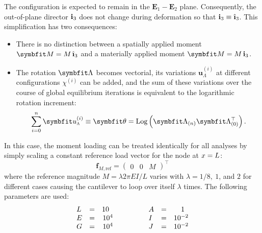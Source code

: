 %
%
The configuration is expected
to remain in the \(\mathbf{E}_1 - \mathbf{E}_2\) plane.
Consequently, the out-of-plane director
\(\mathbf{i}_3\) does not change during deformation so that \(\FrameBasis_3 \equiv \frameBasis_3\).
This simplification has two consequences:
\begin{itemize}
  \item There is no distinction between a spatially applied moment \(\bm{M} = M \, \frameBasis_3\)
    and a materially applied moment \(\bm{M} = M \, \FrameBasis_3\).
  \item The rotation \(\FrameRotation\) becomes
    vectorial, its variations \(\bm{u}_{\scriptscriptstyle{\Lambda}}^{(i)}\) at different configurations \(\chi^{(i)}\) can be added, and the sum of these variations over the course of global equilibrium iterations is equivalent
    to the logarithmic rotation increment:
    \[
      \sum_{i=0}^n \bm{u}_{\scriptscriptstyle{\Lambda}}^{(i)} \equiv \bm{\theta} 
     = \operatorname{Log} \left(\FrameRotation_{(n)}\FrameRotation_{(0)}^{\top}\right).
    \]
\end{itemize}
%
In this case, the moment loading can be treated identically for all analyses by simply scaling a constant reference load vector for the node at \(x=L\):
%
\begin{equation}
  \mathbf{f}_{M,\text{ref}} = \begin{pmatrix}
     0 & 0 & M
  \end{pmatrix}^{\top}
  \label{eq:fref}
\end{equation}
%
where the reference magnitude \(M = \lambda 2 \pi EI/L \) varies with $\lambda=1/8, \ 1$, and $2$ for different cases causing the cantilever to loop over itself \(\lambda\) times. 
The following parameters are used:
\[
\begin{array}{lcr}
    L  &=&    10\hphantom{..}    \\ %
    E  &=&    10^4  \\ %
    G  &=&    10^4  \\ %
\end{array}
\qquad\qquad
\begin{array}{lcr}
    A  &=& 1\hphantom{..} \\
    I  &=& 10^{-2} \\
    J  &=& 10^{-2} \\
\end{array}
\]

